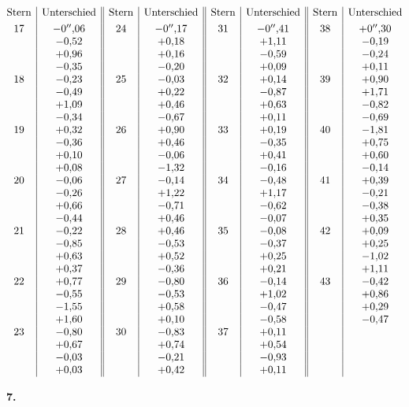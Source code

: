 {\small
\[
\begin{array}{@{}c|c||c|c||c|c||c|c@{}}
\text{Stern}&\text{Unterschied}&\text{Stern}&\text{Unterschied}&
\text{Stern}&\text{Unterschied}&\text{Stern}&\text{Unterschied}\\[.8ex]
17&-0''{,}06&24&-0''{,}17&31&-0''{,}41&38&+0''{,}30\\
&-0{,}52&&+0{,}18&&+1{,}11&&-0{,}19\\
&+0{,}96&&+0{,}16&&-0{,}59&&-0{,}24\\
&-0{,}35&&-0{,}20&&+0{,}09&&+0{,}11\\
18&-0{,}23&25&-0{,}03&32&+0{,}14&39&+0{,}90\\
&-0{,}49&&+0{,}22&&-0{,}87&&+1{,}71\\
&+1{,}09&&+0{,}46&&+0{,}63&&-0{,}82\\
&-0{,}34&&-0{,}67&&+0{,}11&&-0{,}69\\
19&+0{,}32&26&+0{,}90&33&+0{,}19&40&-1{,}81\\
&-0{,}36&&+0{,}46&&-0{,}35&&+0{,}75\\
&+0{,}10&&-0{,}06&&+0{,}41&&+0{,}60\\
&+0{,}08&&-1{,}32&&-0{,}16&&-0{,}14\\
20&-0{,}06&27&-0{,}14&34&-0{,}48&41&+0{,}39\\
&-0{,}26&&+1{,}22&&+1{,}17&&-0{,}21\\
&+0{,}66&&-0{,}71&&-0{,}62&&-0{,}38\\
&-0{,}44&&+0{,}46&&-0{,}07&&+0{,}35\\
21&-0{,}22&28&+0{,}46&35&-0{,}08&42&+0{,}09\\
&-0{,}85&&-0{,}53&&-0{,}37&&+0{,}25\\
&+0{,}63&&+0{,}52&&+0{,}25&&-1{,}02\\
&+0{,}37&&-0{,}36&&+0{,}21&&+1{,}11\\
22&+0{,}77&29&-0{,}80&36&-0{,}14&43&-0{,}42\\
&-0{,}55&&-0{,}53&&+1{,}02&&+0{,}86\\
&-1{,}55&&+0{,}58&&-0{,}47&&+0{,}29\\
&+1{,}60&&+0{,}10&&-0{,}58&&-0{,}47\\
23&-0{,}80&30&-0{,}83&37&+0{,}11&&\\
&+0{,}67&&+0{,}74&&+0{,}54&&\\
&-0{,}03&&-0{,}21&&-0{,}93&&\\
&+0{,}03&&+0{,}42&&+0{,}11&&
\end{array}
\]
\par
}

\begin{center}\textbf{7.}\end{center}

